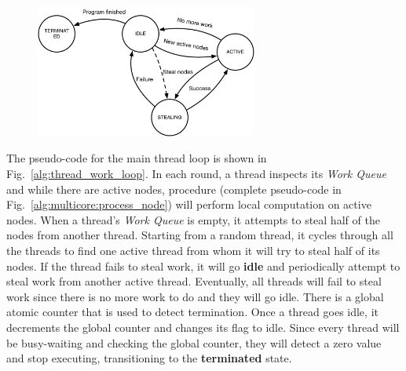 \begin{figure}[ht]
   \centering
   \includegraphics[width=0.65\textwidth]{figures/implementation/thread_states.pdf}
   \label{fig:implementation:thread_states}
\end{figure}

The pseudo-code for the main thread loop is shown in
Fig.~\ref{alg:thread_work_loop}. In each round, a thread inspects its \emph{Work
Queue} and while there are active nodes, procedure 
(complete pseudo-code in Fig.~\ref{alg:multicore:process_node}) will perform
local computation on active nodes. When a thread's \emph{Work Queue} is empty,
it attempts to steal half of the nodes from another thread. Starting from a
random thread, it cycles through all the threads to find one active thread from
whom it will try to steal half of its nodes. If the thread fails to steal work,
it will go \textbf{idle} and periodically attempt to steal work from another
active thread. Eventually, all threads will fail to steal work since there is no
more work to do and they will go idle.  There is a global atomic counter that is
used to detect termination. Once a thread goes idle, it decrements the global
counter and changes its flag to idle.  Since every thread will be busy-waiting
and checking the global counter, they will detect a zero value and stop
executing, transitioning to the \textbf{terminated} state.

